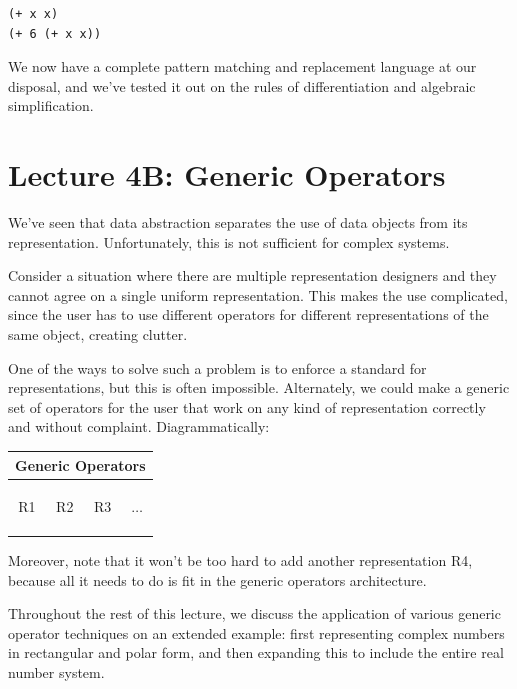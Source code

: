 \documentclass[9pt]{report}
\begin{document}
\begin{verbatim}
(+ x x)
(+ 6 (+ x x))
\end{verbatim}


We now have a complete pattern matching and replacement language at
our disposal, and we've tested it out on the rules of
differentiation and algebraic simplification.


\chapter{Lecture 4B: Generic Operators}
\label{sec:org321ef26}

We've seen that data abstraction separates the use of data objects
from its representation. Unfortunately, this is not sufficient for
complex systems.

Consider a situation where there are multiple representation
designers and they cannot agree on a single uniform representation.
This makes the use complicated, since the user has to use different
operators for different representations of the same object, creating
clutter.

One of the ways to solve such a problem is to enforce a standard for
representations, but this is often impossible. Alternately, we could
make a generic set of operators for the user that work on any kind
of representation correctly and without complaint. Diagrammatically:

\begin{center}
\begin{tabular}{|c|c|c|c|}
\hline
\multicolumn{4}{|c|}{Generic Operators}\\
\hline
&&&\\
&&&\\
&&&\\
R1 & R2 & R3 & $\dots$\\
&&&\\
&&&\\
&&&\\
\hline
\end{tabular}
\end{center}

Moreover, note that it won't be too hard to add another
representation R4, because all it needs to do is fit in the
generic operators architecture.

Throughout the rest of this lecture, we discuss the application of
various generic operator techniques on an extended example: first
representing complex numbers in rectangular and polar form, and then
expanding this to include the entire real number system.
\end{document}
